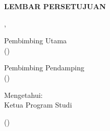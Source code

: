 
\newpage
{}
\begin{center}
    \textbf{\large \MakeUppercase{lembar persetujuan {\tipe}}}
\end{center}

\begin{doublespace}
\end{doublespace}

\vspace{\baselineskip}

\begin{center}
    \begin{doublespace}
        \textbf{\MakeUppercase {\judulid}}
    \end{doublespace}
\end{center}

\vspace{-\baselineskip}

\begin{flushright}
    {\kota}, {\tglpersetujuan}
\end{flushright}

\vspace{\baselineskip}

\begin{center}
    \begin{minipage}{0.45\textwidth}
        \begin{center}
            Pembimbing Utama\\[3cm]
            ({\pembimbingutama})\\
        \end{center}
    \end{minipage}
    \hfill
    \begin{minipage}{0.45\textwidth}
        \begin{center}
            Pembimbing Pendamping\\[3cm]
            ({\pembimbingpendamping})\\
        \end{center}
    \end{minipage}
\end{center}

\vspace{\baselineskip}

\begin{center}
    \begin{doublespace}
        Mengetahui:\\
        Ketua Program Studi \textbf{{\prodi}}\\[3cm]
    \end{doublespace}
    ({\kaprodi})\\
\end{center}
